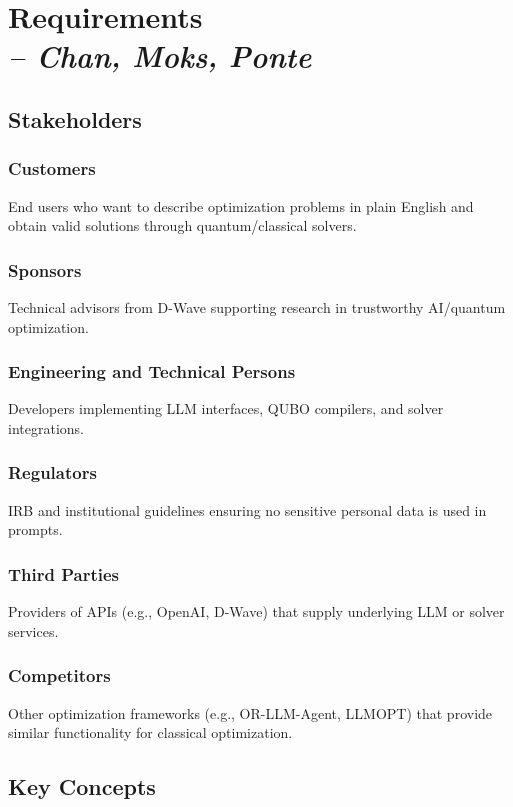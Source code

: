 \chapter{Requirements \\
\small{\textit{-- Chan, Moks, Ponte}}
\label{Chapter::Requirements}}

\section{Stakeholders}
\subsection{Customers} 
End users who want to describe optimization problems in plain English and obtain valid solutions through quantum/classical solvers.  

\subsection{Sponsors}
Technical advisors from D-Wave supporting research in trustworthy AI/quantum optimization.  

\subsection{Engineering and Technical Persons}
Developers implementing LLM interfaces, QUBO compilers, and solver integrations.  

\subsection{Regulators}
IRB and institutional guidelines ensuring no sensitive personal data is used in prompts.  

\subsection{Third Parties}
Providers of APIs (e.g., OpenAI, D-Wave) that supply underlying LLM or solver services.  

\subsection{Competitors} 
Other optimization frameworks (e.g., OR-LLM-Agent, LLMOPT) that provide similar functionality for classical optimization.  

\section{Key Concepts}

